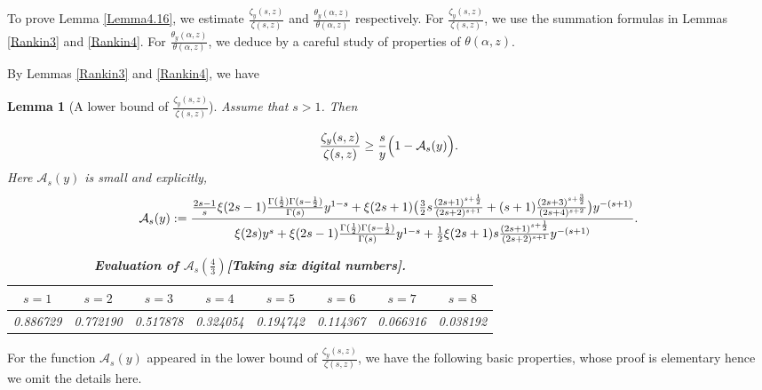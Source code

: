 \documentclass[reqno,english]{amsart}
\newtheorem{lemma}{Lemma}[section]
\newtheorem{open problem}{Open Problem}[section]
\newtheorem{open question}{Open Question}[section]
\newtheorem{open questions on hexagonal lattice}{Open Questions on hexagonal lattice}[section]
\begin{document}
To prove Lemma \ref{Lemma4.16}, we estimate $\frac{\zeta_y(s,z)}{\zeta(s,z)}$ and $\frac{\theta_y(\alpha,z)}{\theta(\alpha,z)}$
respectively. For $\frac{\zeta_y(s,z)}{\zeta(s,z)}$, we use the summation formulas in Lemmas \ref{Rankin3} and \ref{Rankin4}.
For $\frac{\theta_y(\alpha,z)}{\theta(\alpha,z)}$, we deduce by a careful study of properties of $\theta(\alpha,z)$.

By Lemmas \ref{Rankin3} and \ref{Rankin4}, we have
\begin{lemma}[A lower bound of $\frac{\zeta_y(s,z)}{\zeta(s,z)}$]\label{Lemma4.17} Assume that $s>1$. Then

\begin{equation}\aligned\nonumber
\frac{\zeta_y(s,z)}{\zeta(s,z)}\geq\frac{s}{y}
\Big(
1-
\mathcal{A}_s(y)\Big)
.
 \endaligned\end{equation}
Here $\mathcal{A}_s(y)$ is small and explicitly,
\begin{equation}\aligned\label{Asy}
\mathcal{A}_s(y):=\frac{\frac{2s-1}{s}\xi(2s-1)\frac{\Gamma(\frac{1}{2})\Gamma(s-\frac{1}{2})}{\Gamma(s)}y^{1-s}
+\xi(2s+1)\big(
\frac{3}{2}s\frac{(2s+1)^{s+\frac{1}{2}}}{(2s+2)^{s+1}}+(s+1)\frac{(2s+3)^{s+\frac{3}{2}}}{(2s+4)^{s+2}}
\big)y^{-(s+1)}
}
{\xi(2s)y^s+
\xi(2s-1)\frac{\Gamma(\frac{1}{2})\Gamma(s-\frac{1}{2})}{\Gamma(s)}y^{1-s}
+\frac{1}{2}\xi(2s+1)s\frac{(2s+1)^{s+\frac{1}{2}}}{(2s+2)^{s+1}}y^{-(s+1)}}
.
 \endaligned\end{equation}





{\bf
\begin{table}[!htbp]\label{TableB}
\caption{{\bf Evaluation of $\mathcal{A}_s(\frac{4}{3})$[Taking six digital numbers].}}
\label{VP}
\centering
\begin{tabular}{|c|c|c|c|c|c|c|c|}





\hline

 $s=1$  & $s=2$ & $s=3$ & $s=4$ & $s=5$& $s=6$& $s=7$& $s=8$\\

\hline

0.886729 & 0.772190 & 0.517878 &0.324054 &0.194742 &0.114367 &0.066316 &0.038192  \\





\hline





\end{tabular}
\end{table}
}



\end{lemma}
For the function $\mathcal{A}_s(y)$ appeared in the lower bound of $\frac{\zeta_y(s,z)}{\zeta(s,z)}$, we have the following
basic properties, whose proof is elementary hence we omit the details here.
\end{document}
